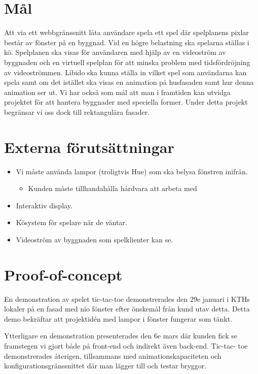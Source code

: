 \documentclass[a4paper,11pt]{article}
\begin{document}
\section{Mål}

  Att via ett webbgränssnitt låta användare spela ett spel där spelplanens
  pixlar består av fönster på en byggnad.  Vid en högre belastning ska
  spelarna ställas i kö.  Spelplanen ska visas för användaren med hjälp av en
  videoström av byggnaden och en virtuell spelplan för att minska problem med
  tidsfördröjning av videoströmmen.  Libido ska kunna ställa in vilket spel
  som användarna kan spela samt om det istället ska visas en animation på
  husfasaden samt hur denna animation ser ut.  Vi har också som mål att man i
  framtiden kan utvidga projektet för att hantera byggnader med speciella
  former.  Under detta projekt begränsar vi oss dock till rektangulära
  fasader.


\section{Externa förutsättningar}

  \begin{itemize}
    \item Vi måste använda lampor (troligtvis Hue) som ska belysa fönstren
          inifrån.
          \begin{itemize}
            \item Kunden måste tillhandahålla hårdvara att arbeta med
          \end{itemize}
    \item Interaktiv display.
    \item Kösystem för spelare när de väntar.
    \item Videoström av byggnaden som spelklienter kan se.
  \end{itemize}


\section{Proof-of-concept}

  En demonstration av spelet tic-tac-toe demonstrerades den 29e januari i KTHs
  lokaler på en fasad med nio fönster efter önskemål från kund utav detta.
  Detta demo bekräftar att projektidén med lampor i fönster fungerar som
  tänkt.

  Ytterligare en demonstration presenterades den 6e mars där kunden fick se
  framstegen vi gjort både på front-end och indirekt även back-end. Tic-tac-
  toe demonstrerades återigen, tillsammans med animationskapaciteten och 
  konfigurationsgränssnittet där man lägger till och testar bryggor.
\end{document}
